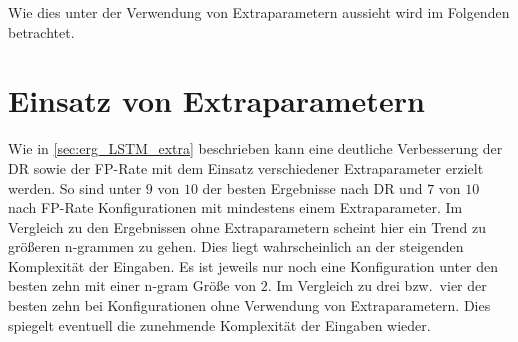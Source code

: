 Wie dies unter der Verwendung von Extraparametern aussieht wird im Folgenden betrachtet.

\section{Einsatz von Extraparametern}

Wie in \autoref{sec:erg_LSTM_extra} beschrieben kann eine deutliche Verbesserung der \ac{DR} sowie  der \ac{FP}-Rate mit dem Einsatz verschiedener Extraparameter erzielt werden.
So sind unter $9$ von $10$ der besten Ergebnisse nach \ac{DR} und $7$ von $10$ nach \ac{FP}-Rate Konfigurationen mit mindestens einem Extraparameter.
Im Vergleich zu den Ergebnissen ohne Extraparametern scheint hier ein Trend zu größeren n-grammen zu gehen.
Dies liegt wahrscheinlich an der steigenden Komplexität der Eingaben.
Es ist jeweils nur noch eine Konfiguration unter den besten zehn mit einer n-gram Größe von $2$.
Im Vergleich zu drei bzw.\ vier der besten zehn bei Konfigurationen ohne Verwendung von Extraparametern.
Dies spiegelt eventuell die zunehmende Komplexität der Eingaben wieder.  
